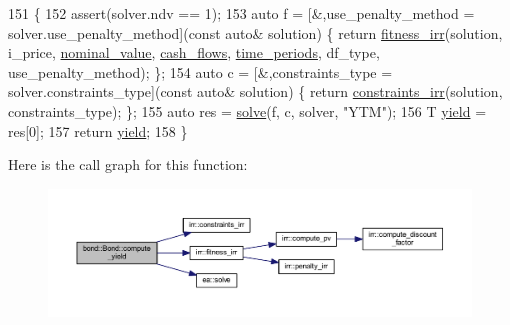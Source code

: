 \begin{DoxyCode}
151     \{
152         assert(solver.ndv == 1);
153         \textcolor{keyword}{auto} f = [&,use\_penalty\_method = solver.use\_penalty\_method](\textcolor{keyword}{const} \textcolor{keyword}{auto}& solution) \{ \textcolor{keywordflow}{return} 
      \hyperlink{namespaceirr_aced01c5e5ef9e171a3b892275d442f8d}{fitness\_irr}(solution, i\_price, \hyperlink{classbond_1_1_bond_a7a79ca13c060697765f13140eb471b84}{nominal\_value}, \hyperlink{classbond_1_1_bond_ae98011d18cd97942b45f5868a42bf668}{cash\_flows}, 
      \hyperlink{classbond_1_1_bond_ac3db034ebeff1f6cd2ed7061fda27fad}{time\_periods}, df\_type, use\_penalty\_method); \};
154         \textcolor{keyword}{auto} c = [&,constraints\_type = solver.constraints\_type](\textcolor{keyword}{const} \textcolor{keyword}{auto}& solution) \{ \textcolor{keywordflow}{return} 
      \hyperlink{namespaceirr_a6801aa96a307b3f52817dd1a3bcd065e}{constraints\_irr}(solution, constraints\_type); \};
155         \textcolor{keyword}{auto} res = \hyperlink{namespaceea_a6450b5bf61e9fdca8b6c19267e14c560}{solve}(f, c, solver, \textcolor{stringliteral}{"YTM"});
156         T \hyperlink{classbond_1_1_bond_ac79ec630d68f58775849145ab305d5f8}{yield} = res[0];
157         \textcolor{keywordflow}{return} \hyperlink{classbond_1_1_bond_ac79ec630d68f58775849145ab305d5f8}{yield};
158     \}
\end{DoxyCode}
Here is the call graph for this function\+:
\nopagebreak
\begin{figure}[H]
\begin{center}
\leavevmode
\includegraphics[width=350pt]{classbond_1_1_bond_ab8a8cfc409d2842e8d9053e53d50468f_cgraph}
\end{center}
\end{figure}
\mbox{\label{classbond_1_1_bond_ab4dba13e68b2685eef680fe7b8155a7a}} 
